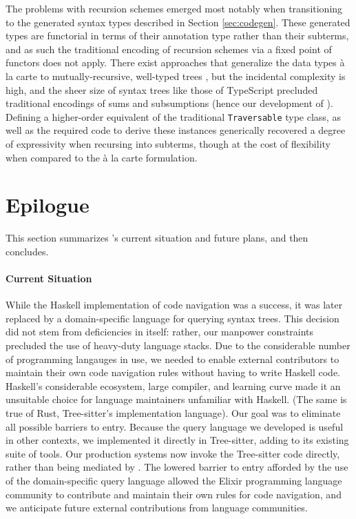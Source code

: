\documentclass[acmsmall,fleqn,12pt]{acmart}
\begin{document}
The problems with recursion schemes emerged most notably when transitioning to
the generated syntax types described in Section \ref{sec:codegen}. These generated types are
functorial in terms of their annotation type rather than their subterms, and as
such the traditional encoding of recursion schemes via a fixed point of functors
does not apply. There exist approaches that generalize the data types à la carte
to mutually-recursive, well-typed trees \cite{bahr11compositional}, but the
incidental complexity is high, and the sheer size of syntax trees like those of
TypeScript precluded traditional encodings of sums and subsumptions (hence our
development of \fastsum{}). Defining a higher-order equivalent of the
traditional \texttt{Traversable} type class, as well as the required code to
derive these instances generically \cite{Magalhaes10generic} recovered a
degree of expressivity when recursing into subterms, though at the cost of
flexibility when compared to the à la carte formulation.

\section{Epilogue}
\label{sec:conclusion}
This section summarizes \semantic's current situation and future plans,
and then concludes.

\paragraph{Current Situation}
%
While the Haskell implementation of code navigation was a success, it was
later replaced by a domain-specific language for querying syntax trees. This
decision did not stem from deficiencies in \semantic{} itself: rather, our
manpower constraints precluded the use of heavy-duty language stacks. Due to
the considerable number of programming langauges in use, we needed to enable
external contributors to maintain their own code navigation rules without
having to write Haskell code. Haskell’s considerable ecosystem, large
compiler, and learning curve made it an unsuitable choice for language
maintainers unfamiliar with Haskell. (The same is true of Rust, Tree-sitter's
implementation language). Our goal was to eliminate all possible
barriers to entry. Because the query language we developed is useful in
other contexts, we implemented it directly in Tree-sitter, adding to its
existing suite of tools. Our production systems now invoke the Tree-sitter
code directly, rather than being mediated by \semantic{}. The lowered
barrier to entry afforded by the use of the domain-specific query language
allowed the Elixir programming language community to contribute and maintain
their own rules for code navigation, and we anticipate future external
contributions from language communities.
\end{document}
